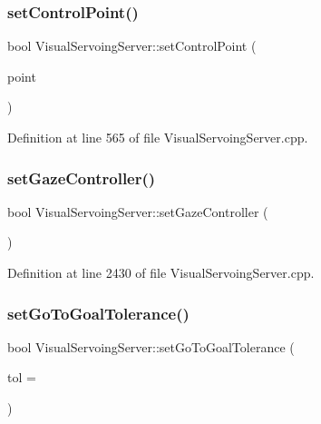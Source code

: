 \subsubsection{\texorpdfstring{set\+Control\+Point()}{setControlPoint()}}
{\footnotesize\ttfamily bool Visual\+Servoing\+Server\+::set\+Control\+Point (\begin{DoxyParamCaption}\item[{const yarp\+::os\+::\+Const\+String \&}]{point }\end{DoxyParamCaption})\hspace{0.3cm}{\ttfamily [override]}}



Definition at line 565 of file Visual\+Servoing\+Server.\+cpp.

\mbox{\label{classVisualServoingServer_a1cea1b6c32f9719cd63c36224fc1b9d2}} 
\subsubsection{\texorpdfstring{set\+Gaze\+Controller()}{setGazeController()}}
{\footnotesize\ttfamily bool Visual\+Servoing\+Server\+::set\+Gaze\+Controller (\begin{DoxyParamCaption}{ }\end{DoxyParamCaption})\hspace{0.3cm}{\ttfamily [private]}}



Definition at line 2430 of file Visual\+Servoing\+Server.\+cpp.

\mbox{\label{classVisualServoingServer_ad632db85663df2f8c7ca5c27eaacfd71}} 
\subsubsection{\texorpdfstring{set\+Go\+To\+Goal\+Tolerance()}{setGoToGoalTolerance()}}
{\footnotesize\ttfamily bool Visual\+Servoing\+Server\+::set\+Go\+To\+Goal\+Tolerance (\begin{DoxyParamCaption}\item[{const double}]{tol = {} }\end{DoxyParamCaption})\hspace{0.3cm}{\ttfamily [override]}}




